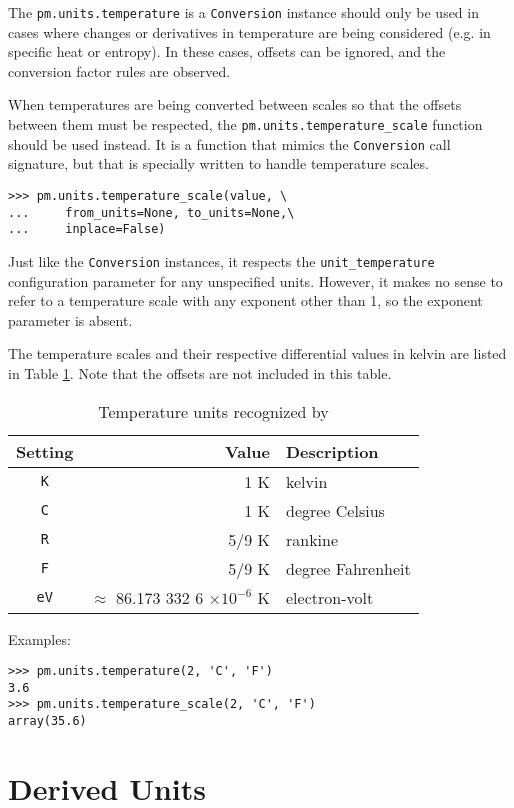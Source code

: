 The \verb|pm.units.temperature| is a \verb|Conversion| instance should only be used in cases where changes or derivatives in temperature are being considered (e.g. in specific heat or entropy).  In these cases, offsets can be ignored, and the conversion factor rules are observed.  

When temperatures are being converted between scales so that the offsets between them must be respected, the \verb|pm.units.temperature_scale| function should be used instead.  It is a function that mimics the \verb|Conversion| call signature, but that is specially written to handle temperature scales. 

\begin{lstlisting}
>>> pm.units.temperature_scale(value, \
...     from_units=None, to_units=None,\
...     inplace=False)
\end{lstlisting}

Just like the \verb|Conversion| instances, it respects the \verb|unit_temperature| configuration parameter for any unspecified units.  However, it makes no sense to refer to a temperature scale with any exponent other than 1, so the exponent parameter is absent.

The temperature scales and their respective differential values in kelvin are listed in Table \ref{tab:temperature}.  Note that the offsets are not included in this table.

\begin{table}
\centering
\caption{Temperature units recognized by \PM}\label{tab:temperature}
\begin{tabular}{crl}
\hline
Setting & Value & Description\\
\hline
\verb|K| & 1 K & kelvin\\
\verb|C| & 1 K & degree Celsius\\
\verb|R| & 5/9 K & rankine\\
\verb|F| & 5/9 K & degree Fahrenheit\\
\verb|eV| & $\approx$ 86.173 332 6 $\times 10^{-6}$ K & electron-volt\\
\hline
\end{tabular}
\end{table}

Examples:
\begin{lstlisting}
>>> pm.units.temperature(2, 'C', 'F')
3.6
>>> pm.units.temperature_scale(2, 'C', 'F')
array(35.6)
\end{lstlisting}


\section{Derived Units}

